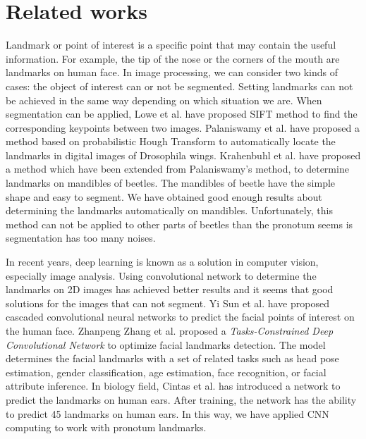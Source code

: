 \documentclass[conference]{IEEEtran}
\begin{document}
\section{Related works}
Landmark or point of interest is a specific point that may contain the useful information. For example, the tip of the nose or the corners of the mouth are landmarks on human face. In image processing, we can consider two kinds of cases: the object of interest can or not be segmented. Setting landmarks can not be achieved in the same way depending on which situation we are. When segmentation can be applied, Lowe et al. \cite{lowe2004distinctive} have proposed SIFT method to find the corresponding keypoints between two images. Palaniswamy et al. \cite{palaniswamy2010automatic} have proposed a method based on probabilistic Hough Transform to automatically locate the landmarks in digital images of Drosophila wings. Krahenbuhl et al. \cite{le2017maelab} have proposed a method which have been extended from Palaniswamy's method, to determine landmarks on mandibles of beetles. The mandibles of beetle have the simple shape and easy to segment. We have obtained good enough results about determining the landmarks automatically on mandibles. Unfortunately, this method can not be applied to other parts of beetles than the pronotum seems is segmentation has too many noises.

In recent years, deep learning is known as a solution in computer vision, especially image analysis. Using convolutional network to determine the landmarks on 2D images has achieved better results and it seems that good solutions for the images that can not segment. Yi Sun et al. \cite{sun2013deep} have proposed cascaded convolutional neural networks to predict the facial points of interest on the human face.
Zhanpeng Zhang et al. \cite{zhang2014facial} proposed a \textit{Tasks-Constrained Deep Convolutional Network} to optimize facial landmarks detection. The model determines the facial landmarks with a set of related tasks such as head pose estimation, gender classification, age estimation, face recognition, or facial attribute inference. In biology field, Cintas et al. \cite{cintas2016automatic} has introduced a network to predict the landmarks on human ears. After training, the network has the ability to predict 45 landmarks on human ears. In this way, we have applied CNN computing to work with pronotum landmarks.
\end{document}
